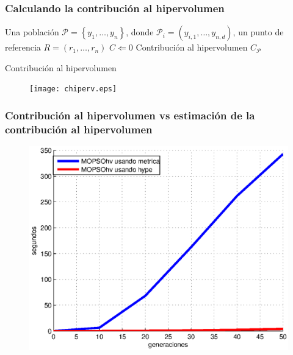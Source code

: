 \documentclass[10pt,compress]{beamer}
\begin{document}
\begin{frame}
  \frametitle{Calculando la contribuci\'on al hipervolumen}
	
	\begin{algorithm}[H]		
		Una poblaci\'on $\mathcal{P}=\left\{y_1,\ldots,y_n\right\}$, donde $\mathcal{P}_i = \left(y_{i,1},\ldots,y_{n,d}\right) $, un punto de referencia $R=\left(r_1,\ldots,r_n\right)$\;		
		$C\Leftarrow 0$\;
		\Return Contribuci\'on al hipervolumen $C_{\mathcal{P}}$\;
		\caption{Contribuci\'on al hipervolumen}
	\end{algorithm}
		\begin{figure}
      \begin{center}
	  \texttt{[image: chiperv.eps]}
      \end{center}	
  
      \end{figure}
\end{frame}
\begin{frame}
  \frametitle{Contribuci\'on al hipervolumen vs estimaci\'on de la contribuci\'on al hipervolumen}	
	\begin{figure}
      \begin{center}
	  \includegraphics[scale=0.6]{time3.eps}
      \end{center}	
     
      \end{figure}
\end{frame}
\end{document}
